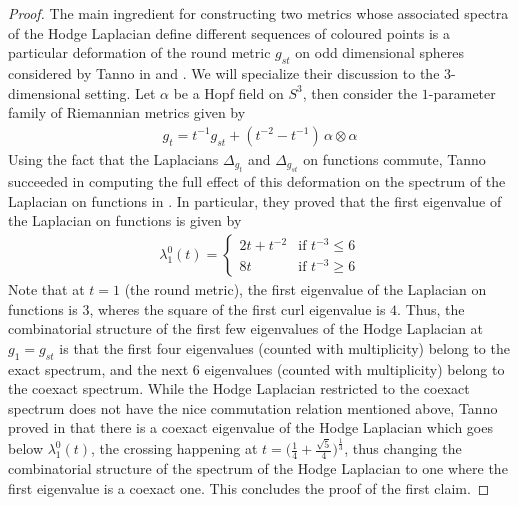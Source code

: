 \begin{proof}
The main ingredient for constructing two metrics whose associated spectra of the Hodge Laplacian define different sequences of coloured points is a particular deformation of the round metric $g_{st}$ on odd dimensional spheres considered by Tanno in \cite{Tanno1979LaplacianFunctions} and \cite{Tanno1983}. We will specialize their discussion to the $3$-dimensional setting. Let $\alpha$ be a Hopf field on $S^3$, then consider the $1$-parameter family of Riemannian metrics given by
\begin{align*}
    g_t = t^{-1} g_{st} +(t^{-2}-t^{-1})\,\alpha\otimes\alpha 
\end{align*}
Using the fact that the Laplacians $\Delta_{g_t}$ and $\Delta_{g_{st}}$ on functions commute, Tanno succeeded in computing the full effect of this deformation on the spectrum of the Laplacian on functions in \cite[Lemma 4.1. and Proposition 4.2.]{Tanno1979LaplacianFunctions}. In particular, they proved that the first eigenvalue of the Laplacian on functions is given by
\begin{align*}
    \lambda_1^0 (t) = \begin{cases}
    2t+t^{-2} & \text{if } t^{-3} \leq 6\\
        8t                                  & \text{if } t^{-3} \geq 6
    \end{cases} 
\end{align*}
Note that at $t=1$ (the round metric), the first eigenvalue of the Laplacian on functions is $3$, wheres the square of the first curl eigenvalue is $4$. Thus, the combinatorial structure of the first few eigenvalues of the Hodge Laplacian at $g_1 = g_{st}$ is that the first four eigenvalues (counted with multiplicity) belong to the exact spectrum, and the next $6$ eigenvalues (counted with multiplicity) belong to the coexact spectrum. While the Hodge Laplacian restricted to the coexact spectrum does not have the nice commutation relation mentioned above, Tanno proved in \cite[Theorem 4.1.]{Tanno1983} that there is a coexact eigenvalue of the Hodge Laplacian which goes below $\lambda_1^0 (t)$, the crossing happening at $t=\big(\frac{1}{4}+\frac{\sqrt{5}}{4}\big)^{\frac{1}{3}}$, thus changing the combinatorial structure of the spectrum of the Hodge Laplacian to one where the first eigenvalue is a coexact one. This concludes the proof of the first claim.



\end{proof}
